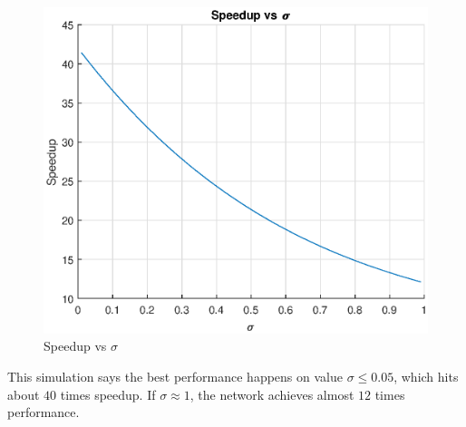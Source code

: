\begin{figure}[!ht]
\centering
\includegraphics[width=1\columnwidth]{figure/vo_sub1.eps}
\caption{Speedup vs $\sigma$}
\label{fig:vo_sub1}
\end{figure}

This simulation says the best performance happens on value $\sigma \leq 0.05$, which hits about $40$ times speedup.  If $\sigma \approx 1$, the network achieves almost $12$ times performance. 

\newpage
